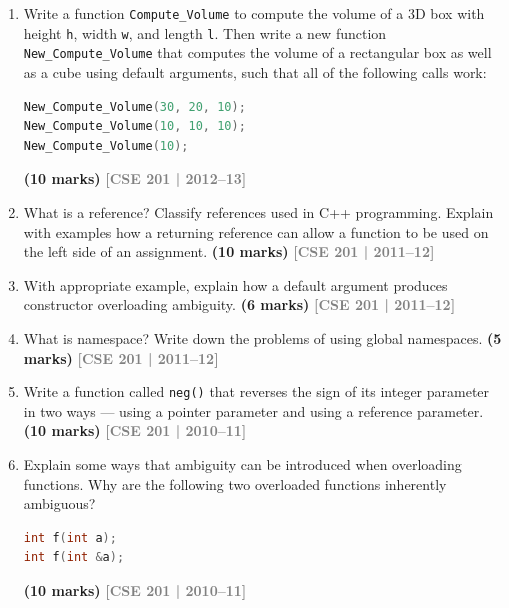 \documentclass[12pt,a3paper]{article}
\newcommand{\yr}[1]{\hfill\textcolor{gray}{\small\textbf{[#1]}}}
\newcommand{\mk}[1]{\textcolor{orange!70!black}{\small\textbf{(#1 marks)}}}
\begin{document}
\begin{enumerate}



\item Write a function \texttt{Compute\_Volume} to compute the volume of a 3D box with height \texttt{h}, width \texttt{w}, and length \texttt{l}. Then write a new function \texttt{New\_Compute\_Volume} that computes the volume of a rectangular box as well as a cube using default arguments, such that all of the following calls work:
\begin{lstlisting}[language=C++]
New_Compute_Volume(30, 20, 10);
New_Compute_Volume(10, 10, 10);
New_Compute_Volume(10);
\end{lstlisting}
\mk{10}
\yr{CSE 201 | 2012--13}





\item What is a reference? Classify references used in C++ programming. Explain with examples how a returning reference can allow a function to be used on the left side of an assignment. \mk{10}
\yr{CSE 201 | 2011--12}




\item With appropriate example, explain how a default argument produces constructor overloading ambiguity. \mk{6}
\yr{CSE 201 | 2011--12}




\item What is namespace? Write down the problems of using global namespaces. \mk{5}
\yr{CSE 201 | 2011--12}




\item Write a function called \texttt{neg()} that reverses the sign of its integer parameter in two ways --- using a pointer parameter and using a reference parameter. \mk{10}
\yr{CSE 201 | 2010--11}





\item Explain some ways that ambiguity can be introduced when overloading functions. Why are the following two overloaded functions inherently ambiguous?
\begin{lstlisting}[language=C++]
int f(int a);
int f(int &a);
\end{lstlisting}
\mk{10}
\yr{CSE 201 | 2010--11}



\end{enumerate}
\end{document}

